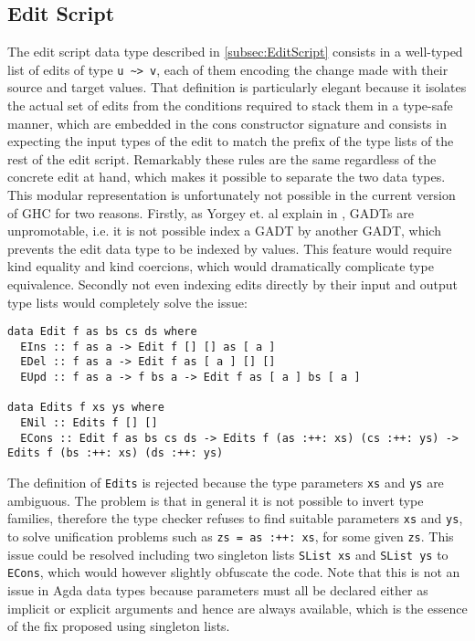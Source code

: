 \documentclass[../Thesis.tex]{subfiles}
\begin{document}
	\subsection{Edit Script}
	The edit script data type described in \ref{subsec:EditScript} consists in
	a well-typed list of edits of type \texttt{u \textasciitilde> v}, each of them
	encoding the change made with their source and target values.
	That definition is particularly elegant because it isolates the actual set of
	edits from the conditions required to stack them in a type-safe manner,
	which are embedded in the cons constructor signature and consists
	in expecting the input types of the edit to match the prefix of the
	type lists of the rest of the edit script.
	Remarkably these rules are the same regardless of the concrete edit 
	at hand, which makes it possible to separate the two data types.
	This modular representation is unfortunately not possible in the current
	version of GHC for two reasons. Firstly, as Yorgey et. al explain in 
	\cite{Yorgey12}, GADTs are unpromotable,  i.e. it is not possible index
	a GADT by another GADT, which prevents the edit data type
	to be indexed by values.
	This feature would require kind equality and kind coercions, which would 
	dramatically complicate type equivalence.
	Secondly not even indexing edits directly by their input and output type lists
	would completely solve the issue:
	
\begin{verbatim}
data Edit f as bs cs ds where
  EIns :: f as a -> Edit f [] [] as [ a ] 
  EDel :: f as a -> Edit f as [ a ] [] [] 
  EUpd :: f as a -> f bs a -> Edit f as [ a ] bs [ a ] 

data Edits f xs ys where
  ENil :: Edits f [] [] 
  ECons :: Edit f as bs cs ds -> Edits f (as :++: xs) (cs :++: ys) -> Edits f (bs :++: xs) (ds :++: ys) 
\end{verbatim}
	
	The definition of \texttt{Edits} is rejected because the type parameters
	\texttt{xs} and \texttt{ys} are ambiguous. The problem is that 
	in general it is not possible to invert type families, therefore
	the type checker refuses to find suitable parameters \texttt{xs} and 
	\texttt{ys}, to solve unification problems such as \texttt{zs = as :++: xs},
	for some given \texttt{zs}. This issue could be resolved including
	two singleton lists \texttt{SList xs} and \texttt{SList ys} to \texttt{ECons},
	which would however slightly obfuscate the code.
	Note that this is not an issue in Agda data types because parameters
	must all be declared either as implicit or explicit arguments and 
	hence are always available, which is the essence of the fix proposed
	using singleton lists.	
	
\end{document}
